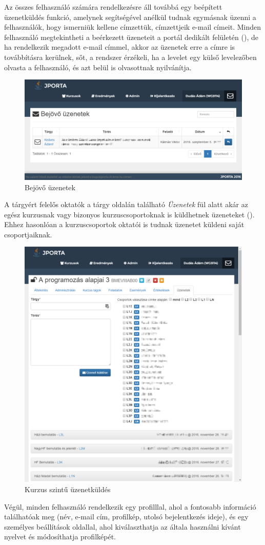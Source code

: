 \sectsep

Az összes felhasználó számára rendelkezésre áll továbbá egy beépített üzenetküldés funkció, amelynek segítségével anélkül tudnak egymásnak üzenni a felhasználók, hogy ismerniük kellene címzettük, címzettjeik e-mail címeit.
Minden felhasználó megtekintheti a beérkezett üzeneteit a portál dedikált felületén (), de ha rendelkezik megadott e-mail címmel, akkor az üzenetek erre a címre is továbbításra kerülnek, sőt, a rendszer érzékeli, ha a levelet egy külső levelezőben olvasta a felhasználó, és azt belül is olvasottnak nyilvánítja.
\begin{figure}[h]
    \centering
    \includegraphics[width=\textwidth]{figures/Jporta-inbox}
    \caption{Bejövő üzenetek}
    \label{figure:jporta-inbox}
\end{figure}
A tárgyért felelős oktatók a tárgy oldalán található \textit{Üzenetek} fül alatt akár az egész kurzusnak vagy bizonyos kurzuscsoportoknak is küldhetnek üzeneteket ().
Ehhez hasonlóan a kurzuscsoportok oktatói is tudnak üzenetet küldeni saját csoportjaiknak.
\begin{figure}[h]
    \centering
    \includegraphics[width=\textwidth]{figures/Jporta-course-messages}
    \caption{Kurzus szintű üzenetküldés}
    \label{figure:jporta-course-messages}
\end{figure}

Végül, minden felhasználó rendelkezik egy profilllal, ahol a fontosabb információ találhatóak meg (név, e-mail cím, profilkép, utolsó bejelentkezés ideje), és egy személyes beállítások oldallal, ahol kiválaszthatja az általa használni kívánt nyelvet és módosíthatja profilképét.